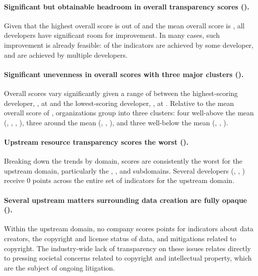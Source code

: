 \documentclass[screen, authorversion, acmsmall]{acmart}
\begin{document}
\paragraph{Significant but obtainable headroom in overall transparency scores ().}
Given that the highest overall score is \maxscore out of \numindicators and the mean overall score is \meanscore, all developers have significant room for improvement.
In many cases, such improvement is already feasible: \numfeasible of the indicators are achieved by some developer, and \numfeasiblemultiple are achieved by multiple developers.


\paragraph{Significant unevenness in overall scores with three major clusters ().}
Overall scores vary significantly given a range of \scorerange between the highest-scoring developer, \meta, at \maxscore and the lowest-scoring developer, \amazon, at \minscore. 
Relative to the mean overall score of \meanscore, organizations group into three clusters: four well-above the mean (\meta, \huggingface, \openai, \stability), three around the mean (\google, \anthropic, \cohere), and three well-below the mean (\aitwentyone, \inflection, \amazon).

\paragraph{Upstream resource transparency scores the worst ().}
Breaking down the trends by domain, scores are consistently the worst for the upstream domain, particularly the \data, \labor, and \compute subdomains.
Several developers (\aitwentyone, \inflection, \amazon) receive 0 points across the entire set of \numupstreamindicators indicators for the upstream domain.

\paragraph{Several upstream matters surrounding data creation are fully opaque ().}
Within the upstream domain, no company scores points for indicators about data creators, the copyright and license status of data, and mitigations related to copyright.
The industry-wide lack of transparency on these issues relates directly to pressing societal concerns related to copyright and intellectual property, which are the subject of ongoing litigation.
\end{document}
